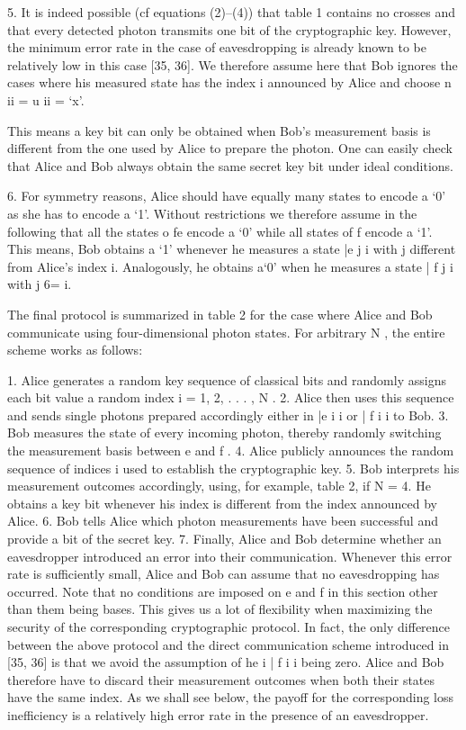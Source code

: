 5. It is indeed possible (cf equations (2)–(4)) that table 1 contains no crosses and that every detected photon transmits one bit of the cryptographic key. However, the minimum error rate in the case of eavesdropping is already known to be relatively low in this case [35, 36]. We therefore assume here that Bob ignores the cases where his measured state has the index i announced by Alice and choose n ii = u ii = ‘x’.

This means a key bit can only be obtained when Bob’s measurement basis is different from the one used by Alice to prepare the photon. One can easily check that Alice and Bob always obtain the same secret key bit under ideal conditions.

6. For symmetry reasons, Alice should have equally many states to encode a ‘0’ as she has to encode a ‘1’. Without restrictions we therefore assume in the following that all the states o fe encode a ‘0’ while all states of f encode a ‘1’. This means, Bob obtains a ‘1’ whenever he measures a state |e j i with j different from Alice’s index i. Analogously, he obtains a‘0’ when he measures a state | f j i with j 6= i.

The final protocol is summarized in table 2 for the case where Alice and Bob communicate using four-dimensional photon states. For arbitrary N , the entire scheme works as follows:

1. Alice generates a random key sequence of classical bits and randomly assigns each bit value a random index i = 1, 2, . . . , N .
2. Alice then uses this sequence and sends single photons prepared accordingly either in |e i i or | f i i to Bob.
3. Bob measures the state of every incoming photon, thereby randomly switching the measurement basis between e and f .
4. Alice publicly announces the random sequence of indices i used to establish the cryptographic key.
5. Bob interprets his measurement outcomes accordingly, using, for example, table 2, if N = 4. He obtains a key bit whenever his index is different from the index announced by Alice.
6. Bob tells Alice which photon measurements have been successful and provide a bit of the secret key.
7. Finally, Alice and Bob determine whether an eavesdropper introduced an error into their communication. Whenever this error rate is sufficiently small, Alice and Bob can assume that no eavesdropping has occurred.
Note that no conditions are imposed on e and f in this section other than them being bases. This gives us a lot of flexibility when maximizing the security of the corresponding cryptographic protocol. In fact, the only difference between the above protocol and the direct communication scheme introduced in [35, 36] is that we avoid the assumption of he i | f i i being zero. Alice and Bob therefore have to discard their measurement outcomes when both their states have the same index. As we shall see below, the payoff for the corresponding loss inefficiency is a relatively high error rate in the presence of an eavesdropper.


